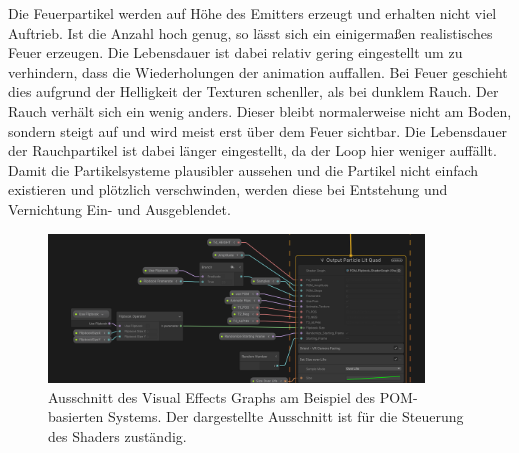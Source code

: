 Die Feuerpartikel werden auf Höhe des Emitters erzeugt und erhalten nicht viel Auftrieb. Ist die Anzahl hoch genug, so lässt sich ein einigermaßen realistisches Feuer erzeugen. 
Die Lebensdauer ist dabei relativ gering eingestellt um zu verhindern, dass die Wiederholungen der animation auffallen. Bei Feuer geschieht dies aufgrund der Helligkeit der Texturen schenller, als
bei dunklem Rauch. Der Rauch verhält sich ein wenig anders. Dieser bleibt normalerweise nicht am Boden, sondern steigt auf und wird meist erst über dem Feuer sichtbar. 
Die Lebensdauer der Rauchpartikel ist dabei länger eingestellt, da der Loop hier weniger auffällt. Damit die Partikelsysteme plausibler aussehen und die Partikel nicht einfach existieren und plötzlich verschwinden, 
werden diese bei Entstehung und Vernichtung Ein- und Ausgeblendet. 


\begin{figure}[h]
	\centering
	\includegraphics[width=0.89\textwidth]{Grafiken/Implementation/Partikelsystem/vfxGraphShader.png}
	\begin{footnotesize}
		\caption{Ausschnitt des Visual Effects Graphs am Beispiel des POM-basierten Systems. Der dargestellte Ausschnitt ist für die Steuerung des Shaders zuständig.}
		\label{fig:vfxShader}
	\end{footnotesize}
\end{figure}